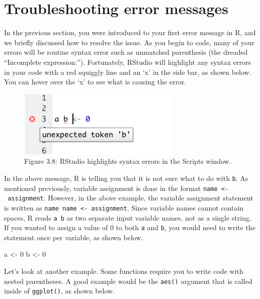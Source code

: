 \documentclass[
]{book}
\newenvironment{Shaded}{\begin{snugshade}}{\end{snugshade}}
\newcommand{\DecValTok}[1]{\textcolor[rgb]{0.00,0.00,0.81}{#1}}
\newcommand{\NormalTok}[1]{#1}
\newcommand{\OtherTok}[1]{\textcolor[rgb]{0.56,0.35,0.01}{#1}}
\begin{document}
\hypertarget{troubleshooting-error-messages}{%
\section{Troubleshooting error messages}\label{troubleshooting-error-messages}}

In the previous section, you were introduced to your first error message in R, and we briefly discussed how to resolve the issue. As you begin to code, many of your errors will be routine syntax error such as unmatched parenthesis (the dreaded ``Incomplete expression:''). Fortunately, RStudio will highlight any syntax errors in your code with a red squiggly line and an `x' in the side bar, as shown below. You can hover over the `x' to see what is causing the error.

\begin{figure}
\centering
\includegraphics{images/Rstudio_diagnostics.png}
\caption{Figure 3.8: RStudio highlights syntax errors in the Scripts window.}
\end{figure}

In the above message, R is telling you that it is not sure what to do with \texttt{b}. As mentioned previously, variable assignment is done in the format \texttt{name\ \textless{}-\ assignment}. However, in the above example, the variable assignment statement is written as \texttt{name\ name\ \textless{}-\ assignment}. Since variable names cannot contain spaces, R reads \texttt{a\ b} as two separate input variable names, not as a single string. If you wanted to assign a value of 0 to both \texttt{a} and \texttt{b}, you would need to write the statement once per variable, as shown below.

\begin{Shaded}
\begin{Highlighting}[]
\NormalTok{a }\OtherTok{\textless{}{-}} \DecValTok{0}
\NormalTok{b }\OtherTok{\textless{}{-}} \DecValTok{0}
\end{Highlighting}
\end{Shaded}

Let's look at another example. Some functions require you to write code with nested parentheses. A good example would be the \texttt{aes()} argument that is called inside of \texttt{ggplot()}, as shown below.
\end{document}
